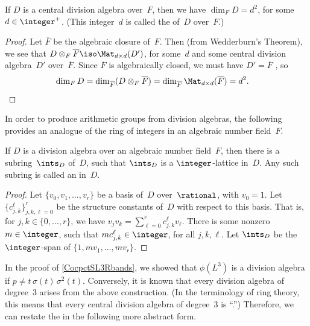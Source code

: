 \begin{cor}
If $D$ is a central division algebra over~$F$, then we have $\dim_F D = d^2$, for some $d \in \integer^+$. \textup(This integer~$d$ is called the  of~$D$ over~$F$.\textup)
\end{cor}

\begin{proof}
Let $\overline{F}$ be the algebraic closure of~$F$. Then (from {Wedderburn's Theorem}), we see that $D \otimes_F \overline{F} \iso \Mat_{d \times d}(D')$, for some~$d$ and some central division algebra~$D'$ over~$\overline{F}$. Since $\overline{F}$ is algebraically closed, we must have $D' = \overline{F}$ , so
	\begin{align*}
	\dim_F D = \dim_{\overline{F}} (D \otimes_F \overline{F})
	= \dim_{\overline{F}} \Mat_{d \times d}(\overline{F})
	= d^2 
	. & \qedhere \end{align*}
\end{proof}

In order to produce arithmetic groups from division algebras, the following  provides an analogue of the ring of integers in an
algebraic number field~$F$. 

\begin{lem} \label{OinDivAlg}
 If $D$ is a division algebra over an algebraic
number field~$F$, then there is a subring~$\ints_D$
of~$D$, such that $\ints_D$ is a $\integer$-lattice
in~$D$. Any such subring is called an {\upshape{}} in~$D$.
 \end{lem}

\begin{proof}
 Let $\{v_0,v_1,\ldots,v_r\}$ be a basis of~$D$
over~$\rational$, with $v_0 = 1$. Let
$\{c_{j,k}^\ell\}_{j,k,\ell=0}^r$ be the structure constants
of~$D$ with respect to this basis. That is, for $j,k \in
\{0,\ldots,r\}$, we have
 $ v_j v_k = \sum_{\ell=0}^r c_{j,k}^\ell v_\ell $.
 There is some nonzero $m \in \integer$, such that $m
c_{j,k}^\ell \in \integer$, for all $j,k,\ell$. Let
$\ints_D$ be the $\integer$-span of
$\{1, mv_1,\ldots,mv_r\}$.
 \end{proof}

In the proof of \cref{CocpctSL3Rbands}, we showed that
$\phi(L^3)$ is a division algebra if
 $p \neq t\, \sigma(t) \, \sigma^2(t)$.
 Conversely, it is known that every division algebra of degree~$3$ arises from the above construction. (In the terminology of ring theory, this means that every central division algebra of degree~$3$ is ``\label{CubicAlgIsCyclic}\zz.'') Therefore, we can restate the  in the following more abstract form.  
 
